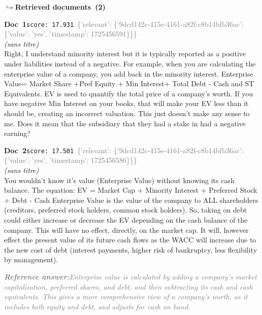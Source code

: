 \documentclass[a4paper,11pt]{article}
\begin{document}
\noindent\hfill{\footnotesize\textcolor{doccolor}{\textbf{$\hookrightarrow$\enspace Retrieved documents~(2)}}}
\begin{docenv}
{\footnotesize\textcolor{doccolor}{\textbf{Doc~1}}}\hfill{\tiny\texttt{score:~17.931}}\ {\tiny\textcolor{gray}{\{'relevant': \{'9dcd142c-415e-4161-a82f-c8b14bfb36ac': \{'value': 'yes', 'timestamp': 1725456591\}\}\}}}\\[3pt]
{\small\textit{(sans titre)}}\\[2pt]
\vspace{2pt}
{\footnotesize 
Right, I understand minority interest but it is typically reported as a positive under liabilities instead of a negative. For example, when you are calculating the enterprise value of a company, you add back in the minority interest.    Enterprise Value= Market Share +Pref Equity + Min Interest+ Total Debt - Cash and ST Equivalents.    EV is used to quantify the total price of a company's worth. If you have negative Min Interest on your books, that will make your EV less than it should be, creating an incorrect valuation.   This just doesn't make any sense to me. Does it mean that the subsidiary that they had a stake in had a negative earning?}
\end{docenv}
\begin{docenv}
{\footnotesize\textcolor{doccolor}{\textbf{Doc~2}}}\hfill{\tiny\texttt{score:~17.501}}\ {\tiny\textcolor{gray}{\{'relevant': \{'9dcd142c-415e-4161-a82f-c8b14bfb36ac': \{'value': 'yes', 'timestamp': 1725456586\}\}\}}}\\[3pt]
{\small\textit{(sans titre)}}\\[2pt]
\vspace{2pt}
{\footnotesize 
You wouldn't know it's value (Enterprise Value) without knowing its cash balance.  The equation:   EV = Market Cap + Minority Interest + Preferred Stock + Debt - Cash  Enterprise Value is the value of the company to ALL shareholders (creditors, preferred stock holders, common stock holders).  So, taking on debt could either increase or decrease the EV depending on the cash balance of the company.  This will have no effect, directly, on the market cap. It will, however effect the present value of its future cash flows as the WACC will increase due to the new cost of debt (interest payments, higher risk of bankruptcy, less flexibility by management).}
\end{docenv}
\begin{refanswerenv}
{\footnotesize\textit{\textcolor{gray}{\textbf{Reference answer:}\enspace Enterprise value is calculated by adding a company's market capitalization, preferred shares, and debt, and then subtracting its cash and cash equivalents. This gives a more comprehensive view of a company's worth, as it includes both equity and debt, and adjusts for cash on hand.}}}
\end{refanswerenv}
\end{document}
